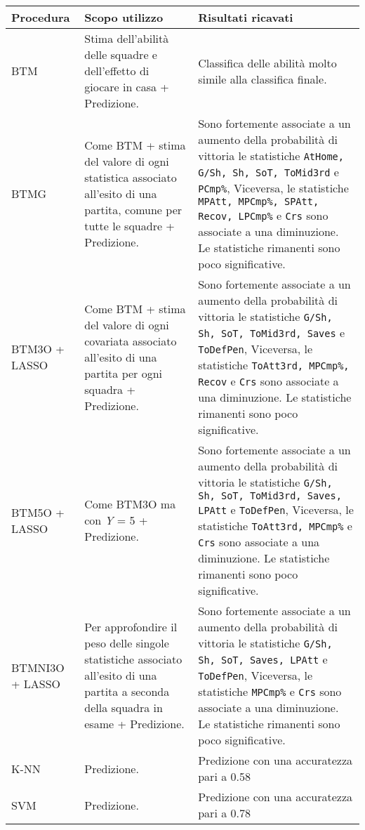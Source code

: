 \begin{table}[]
\begin{longtable}{|C{0.18\textwidth}|C{0.3\textwidth}|C{0.5\textwidth}|}
	\hline	
	\textbf{Procedura} & \textbf{Scopo utilizzo} & \textbf{Risultati ricavati}\\
	\hline			
	BTM & Stima dell'abilità delle squadre e dell'effetto di giocare in casa + Predizione. & Classifica delle abilità molto simile alla classifica finale. \\
	\hline	
	BTMG & Come BTM + stima del valore di ogni statistica associato all'esito di una partita, comune per tutte le squadre + Predizione. & Sono fortemente associate a un aumento della probabilità di vittoria le statistiche \texttt{AtHome, G/Sh, Sh, SoT, ToMid3rd} e \texttt{PCmp\%}, Viceversa, le statistiche \texttt{MPAtt, MPCmp\%, SPAtt, Recov, LPCmp\%} e \texttt{Crs} sono associate a una diminuzione. Le statistiche rimanenti sono poco significative.\\
	\hline	
	BTM3O + LASSO & Come BTM + stima del valore di ogni covariata associato all'esito di una partita per ogni squadra + Predizione. & Sono fortemente associate a un aumento della probabilità di vittoria le statistiche \texttt{G/Sh, Sh, SoT, ToMid3rd, Saves} e \texttt{ToDefPen}, Viceversa, le statistiche \texttt{ToAtt3rd, MPCmp\%, Recov} e \texttt{Crs} sono associate a una diminuzione. Le statistiche rimanenti sono poco significative. \\
	\hline	
	BTM5O + LASSO & Come BTM3O ma con \emph{Y} = 5 + Predizione. & Sono fortemente associate a un aumento della probabilità di vittoria le statistiche \texttt{G/Sh, Sh, SoT, ToMid3rd, Saves, LPAtt} e \texttt{ToDefPen}, Viceversa, le statistiche \texttt{ToAtt3rd, MPCmp\%} e \texttt{Crs} sono associate a una diminuzione. Le statistiche rimanenti sono poco significative. \\
	\hline	
	BTMNI3O + LASSO & Per approfondire il peso delle singole statistiche associato all'esito di una partita a seconda della squadra in esame + Predizione. & Sono fortemente associate a un aumento della probabilità di vittoria le statistiche \texttt{G/Sh, Sh, SoT, Saves, LPAtt} e \texttt{ToDefPen}, Viceversa, le statistiche \texttt{MPCmp\%} e \texttt{Crs} sono associate a una diminuzione. Le statistiche rimanenti sono poco significative. \\
	\hline	
	K-NN & Predizione. & Predizione con una accuratezza pari a 0.58\\
	\hline	
	SVM & Predizione. & Predizione con una accuratezza pari a 0.78\\

\end{longtable}
\end{table}
